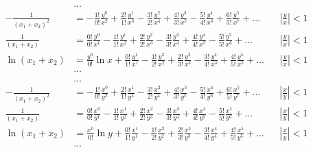 \begin{equation*} \begin{aligned}
&\ldots \\
%
- \frac{1}{(x_1 + x_2)^2} &= 
- \frac{1!}{0!} \frac{y^0}{x^2}
+ \frac{2!}{1!} \frac{y^1}{x^3}
- \frac{3!}{2!} \frac{y^2}{x^4}
+ \frac{4!}{3!} \frac{y^3}{x^5}
- \frac{5!}{4!} \frac{y^4}{x^6}
+ \frac{6!}{5!} \frac{y^5}{x^7}
+ \ldots & 
&\left| \frac{y}{x} \right| < 1 \\
%
  \frac{1}{(x_1 + x_2)} &= 
  \frac{0!}{0!} \frac{y^0}{x^1}
- \frac{1!}{1!} \frac{y^1}{x^2}
+ \frac{2!}{2!} \frac{y^2}{x^3}
- \frac{3!}{3!} \frac{y^3}{x^4}
+ \frac{4!}{4!} \frac{y^4}{x^5}
- \frac{5!}{5!} \frac{y^5}{x^6}
+ \ldots & 
&\left| \frac{y}{x} \right| < 1 \\
%
  \ln(x_1 + x_2) &= 
  \frac{y^0}{0!} \ln{x}
+ \frac{0!}{1!} \frac{y^1}{x^1} 
- \frac{1!}{2!} \frac{y^2}{x^2}
+ \frac{2!}{3!} \frac{y^3}{x^3}
- \frac{3!}{4!} \frac{y^4}{x^4}
+ \frac{4!}{5!} \frac{y^5}{x^5}
+ \ldots & 
&\left| \frac{y}{x} \right| < 1 \\
%
&\ldots \\
\end{aligned} \end{equation*}
\begin{equation*} \begin{aligned}
&\ldots \\
%
- \frac{1}{(x_1 + x_2)^2} &= 
- \frac{1!}{0!} \frac{x^0}{y^2}
+ \frac{2!}{1!} \frac{x^1}{y^3}
- \frac{3!}{2!} \frac{x^2}{y^4}
+ \frac{4!}{3!} \frac{x^3}{y^5}
- \frac{5!}{4!} \frac{x^4}{y^6}
+ \frac{6!}{5!} \frac{x^5}{y^7}
+ \ldots & 
&\left| \frac{x}{y} \right| < 1 \\
%
  \frac{1}{(x_1 + x_2)} &= 
  \frac{0!}{0!} \frac{x^0}{y^1}
- \frac{1!}{1!} \frac{x^1}{y^2}
+ \frac{2!}{2!} \frac{x^2}{y^3}
- \frac{3!}{3!} \frac{x^3}{y^4}
+ \frac{4!}{4!} \frac{x^4}{y^5}
- \frac{5!}{5!} \frac{x^5}{y^6}
+ \ldots & 
&\left| \frac{x}{y} \right| < 1 \\
%
  \ln(x_1 + x_2) &= 
  \frac{x^0}{0!} \ln{y}
+ \frac{0!}{1!} \frac{x^1}{y^1} 
- \frac{1!}{2!} \frac{x^2}{y^2}
+ \frac{2!}{3!} \frac{x^3}{y^3}
- \frac{3!}{4!} \frac{x^4}{y^4}
+ \frac{4!}{5!} \frac{x^5}{y^5}
+ \ldots & 
&\left| \frac{x}{y} \right| < 1 \\
%
&\ldots \\
\end{aligned} \end{equation*}
